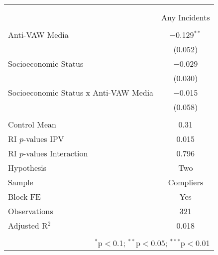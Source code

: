 
\begin{tabular}{@{\extracolsep{5pt}}lc} 
\\[-1.8ex]\hline 
\hline \\[-1.8ex] 
\\[-1.8ex] & Any Incidents \\ 
\hline \\[-1.8ex] 
 Anti-VAW Media & $-$0.129$^{**}$ \\ 
  & (0.052) \\ 
  Socioeconomic Status & $-$0.029 \\ 
  & (0.030) \\ 
  Socioeconomic Status x Anti-VAW Media & $-$0.015 \\ 
  & (0.058) \\ 
 \hline \\[-1.8ex] 
Control Mean & 0.31 \\ 
RI $p$-values IPV & 0.015 \\ 
RI $p$-values Interaction & 0.796 \\ 
Hypothesis & Two \\ 
Sample & Compliers \\ 
Block FE & Yes \\ 
Observations & 321 \\ 
Adjusted R$^{2}$ & 0.018 \\ 
\hline 
\hline \\[-1.8ex] 
\multicolumn{2}{r}{$^{*}$p$<$0.1; $^{**}$p$<$0.05; $^{***}$p$<$0.01} \\ 
\end{tabular} 
